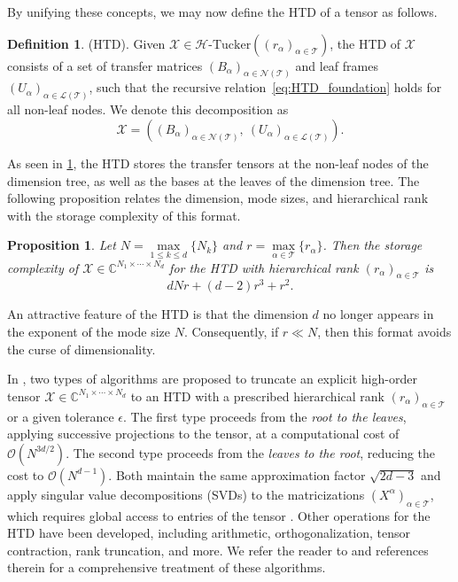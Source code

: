 \documentclass{article}
\theoremstyle{plain}
\newtheorem{proposition}[theorem]{Proposition}
\theoremstyle{definition}
\newtheorem{definition}[theorem]{Definition}
\theoremstyle{remark}
\begin{document}
By unifying these concepts, we may now define the HTD of a tensor as follows.
\begin{definition}
\label{def:HTD}
(HTD).  
Given \(\mathcal{X} \in \mathcal{H}\text{-Tucker}((r_\alpha)_{\alpha \in \mathcal{T}})\), the HTD of \(\mathcal{X}\) consists of a set of transfer matrices \((B_\alpha)_{\alpha \in \mathcal{N}(\mathcal{T})}\) and leaf frames \((U_\alpha)_{\alpha \in \mathcal{L}(\mathcal{T})}\), such that the recursive relation~\eqref{eq:HTD_foundation} holds for all non-leaf nodes.  
We denote this decomposition as  
\[
\mathcal{X} = ((B_\alpha)_{\alpha\in\mathcal{N}(\mathcal{T})},\ (U_\alpha)_{\alpha\in\mathcal{L}(\mathcal{T})}).
\]
\end{definition}

As seen in \cref{def:HTD}, the HTD stores the transfer tensors at the non-leaf nodes of the dimension tree, as well as the bases at the leaves of the dimension tree. The following proposition relates the dimension, mode sizes, and hierarchical rank with the storage complexity of this format.
\begin{proposition}\label{prop:HTD_storage}
Let $N = \max\limits_{1 \leq k \leq d} \{N_k\}$ and $r = \max\limits_{\alpha \in \mathcal{T}} \{r_\alpha\}$. Then the storage complexity of $\mathcal{X} \in \mathbb{C}^{N_1 \times \cdots \times N_d}$ for the HTD with hierarchical rank $(r_{\alpha})_{\alpha\in\mathcal{T}}$ is
\begin{equation}
    dNr + (d - 2)r^3 + r^2.
\end{equation}
\end{proposition} 
\vspace{-0.5cm} An attractive feature of the HTD is that the dimension $d$ no longer appears in the exponent of the mode size $N$. Consequently, if $r \ll N$, then this format avoids the curse of dimensionality.

In \cite{grasedyck2010hierarchical_SIMAA}, two types of algorithms are proposed to truncate an explicit high-order tensor $\mathcal{X} \in \mathbb{C}^{N_1\times\cdots\times N_d}$ to an HTD with a prescribed hierarchical rank $(r_\alpha)_{\alpha\in\mathcal{T}}$ or a given tolerance $\epsilon$.  
The first type proceeds from the \emph{root to the leaves}, applying successive projections to the tensor, at a computational cost of $\mathcal{O}(N^{3d/2})$.  
The second type proceeds from the \emph{leaves to the root}, reducing the cost to \(\mathcal{O}(N^{d-1})\).  
Both maintain the same approximation factor \(\sqrt{2d - 3}\) and apply singular value decompositions (SVDs) to the matricizations \((X^{\alpha})_{\alpha\in\mathcal{T}}\), which requires global access to entries of the tensor \cite{grasedyck2010hierarchical_SIMAA,kressner2012htucker}. Other operations for the HTD have been developed, including arithmetic, orthogonalization, tensor contraction, rank truncation, and more. We refer the reader to \cite{kressner2012htucker} and references therein for a comprehensive treatment of these algorithms.
\end{document}
